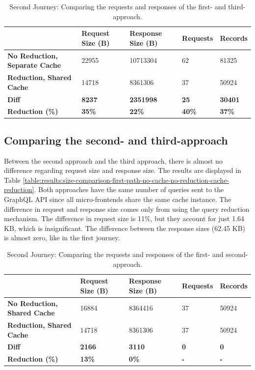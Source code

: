 \ifshowTables
\begin{table}[H]
  \begin{tabular}{|l|l|l|l|l|}
  \hline
  & \textbf{Request Size (B)} & \textbf{Response Size (B)} & \textbf{Requests} & \textbf{Records} \\
  \hline
  \textbf{No Reduction, Separate Cache} & 22955 & 10713304 & 62 & 81325 \\
  \hline
  \textbf{Reduction, Shared Cache} & 14718 & 8361306 & 37 & 50924 \\
  \hline
  \hline
  \textbf{Diff} & \textbf{8237} & \textbf{2351998} & \textbf{25} & \textbf{30401} \\
  \hline
  \textbf{Reduction (\%)} & \textbf{35\%} & \textbf{22\%} & \textbf{40\%} & \textbf{37\%} \\
  \hline
  \end{tabular}
  \caption{Second Journey: Comparing the requests and responses of the first- and third-approach.}\label{table:results:size-comparison-second-path-no-cache-no-reduction-cache-reduction}
\end{table}
\fi

\subsection{Comparing the second- and third-approach}\label{subsection:results:comparison-second-path-first-third-approach}

Between the second approach and the third approach, there is almost no difference regarding request size and response size. The results are displayed in Table \ref{table:results:size-comparison-first-path-no-cache-no-reduction-cache-reduction}. Both approaches have the same number of queries sent to the GraphQL API since all micro-frontends share the same cache instance. The difference in request and response size comes only from using the query reduction mechanism. The difference in request size is 11\%, but they account for just 1.64 KB, which is insignificant. The difference between the response sizes (62.45 KB) is almost zero, like in the first journey.

\ifshowTables
\begin{table}[H]
\begin{tabular}{|l|l|l|l|l|}
  \hline
  & \textbf{Request Size (B)} & \textbf{Response Size (B)} & \textbf{Requests} & \textbf{Records} \\
  \hline
  \textbf{No Reduction, Shared Cache} & 16884 & 8364416 & 37 & 50924 \\
  \hline
  \textbf{Reduction, Shared Cache} & 14718 & 8361306 & 37 & 50924 \\
  \hline
  \hline
  \textbf{Diff} & \textbf{2166} & \textbf{3110} & \textbf{0} & \textbf{0} \\
  \hline
  \textbf{Reduction (\%)} & \textbf{13\%} & \textbf{0\%} & \textbf{-} & \textbf{-} \\
  \hline
  \end{tabular}
  \caption{Second Journey: Comparing the requests and responses of the first- and second-approach.}\label{table:results:size-comparison-second-path-no-cache-no-reduction-cache-no-reduction}
\end{table}
\fi